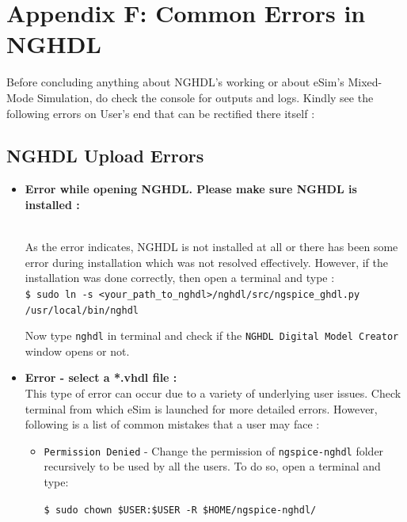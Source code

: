 \pagebreak 

\section {Appendix F: Common Errors in NGHDL}

Before concluding anything about NGHDL’s working or about eSim’s Mixed-Mode Simulation, do check the console for outputs and logs. Kindly see the following errors on User’s end that can be rectified there itself :

\subsection{NGHDL Upload Errors}

\begin{itemize}
    \item \textbf{Error while opening NGHDL. Please make sure NGHDL is installed :}

 \\
As the error indicates, NGHDL is not installed at all or there has been some error during installation which was not resolved effectively. However, if the installation was done correctly, then open a terminal and type : \\

\noindent \texttt{\$ sudo ln -s <your\_path\_to\_nghdl>/nghdl/src/ngspice\_ghdl.py /usr/loc\linebreak     al/bin/nghdl}


Now type  \texttt{nghdl} in terminal and check if the \texttt{NGHDL Digital Model Creator} window opens or not.

\item \textbf{Error - select a *.vhdl file :} \\
This type of error can occur due to a variety of underlying user issues. Check terminal from which eSim is launched for more detailed errors. However, following is a list of common mistakes that a user may face : 
\begin{itemize}
    \item \texttt{Permission Denied} - Change the permission of \texttt{ngspice-nghdl} folder 
recursively to be used by all the users. To do so, open a terminal and type:
\begin{center}
    \texttt{\$ sudo chown \$USER:\$USER -R \$HOME/ngspice-nghdl/}
\end{center} 

\end{itemize}


\end{itemize}
